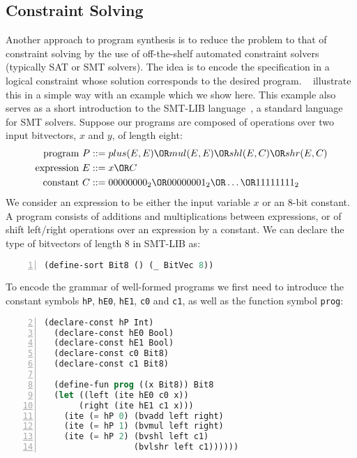 \subsection{Constraint Solving}
\label{sec:constraint-solving}

Another approach to program synthesis is to reduce the problem to that of
constraint solving by the use of off-the-shelf automated constraint
solvers~\cite{Shi:2019:FCS,Feng:2018:PSU,Feng:2017:CST,Feng:2017:CSC,Solar-Lezama:2008,Jha:oracle:2010}
(typically SAT or SMT solvers).
The idea is to encode the specification in a logical constraint whose solution
corresponds to the desired program.
\citeauthor{Gulwani2017}~\cite{Gulwani2017} illustrate this in a simple way with
an example which we show here.
This example also serves as a short introduction to the SMT-LIB
language~\cite{BarFT-RR-17}, a standard language for SMT solvers.
Suppose our programs are composed of operations over two input bitvectors, $x$
and $y$, of length eight:
%
\begin{align*}
  \text{program }P    &::= plus(E,E) \OR mul(E,E) \OR shl(E,C) \OR shr(E,C)    \\
  \text{expression }E &::= x \OR C                                             \\
  \text{constant }C   &::= 00000000_2 \OR 00000001_2 \OR \ldots \OR 11111111_2 \\
\end{align*}
%
\noindent
We consider an expression to be either the input variable $x$ or an 8-bit
constant.
A program consists of additions and multiplications between expressions, or of
shift left/right operations over an expression by a constant.
We can declare the type of bitvectors of length 8 in SMT-LIB as:
%
\begin{lstlisting}[language=Lisp,numbers=left,
  firstnumber=1,
  morekeywords={define-sort},
  xleftmargin=.2\textwidth, xrightmargin=.2\textwidth]
  (define-sort Bit8 () (_ BitVec 8))
\end{lstlisting}
%
\noindent
To encode the grammar of well-formed programs we first need to introduce the
constant symbols \texttt{hP}, \texttt{hE0}, \texttt{hE1}, \texttt{c0} and
\texttt{c1}, as well as the function symbol \texttt{prog}:
%
\begin{lstlisting}[language=Lisp,
  numbers=left,
  firstnumber=2,
  morekeywords={declare-const,define-fun,ite},
  xleftmargin=.2\textwidth, xrightmargin=.2\textwidth]
  (declare-const hP Int)
  (declare-const hE0 Bool)
  (declare-const hE1 Bool)
  (declare-const c0 Bit8)
  (declare-const c1 Bit8)

  (define-fun prog ((x Bit8)) Bit8
  (let ((left (ite hE0 c0 x))
       (right (ite hE1 c1 x)))
    (ite (= hP 0) (bvadd left right)
    (ite (= hP 1) (bvmul left right)
    (ite (= hP 2) (bvshl left c1)
                  (bvlshr left c1))))))
\end{lstlisting}
